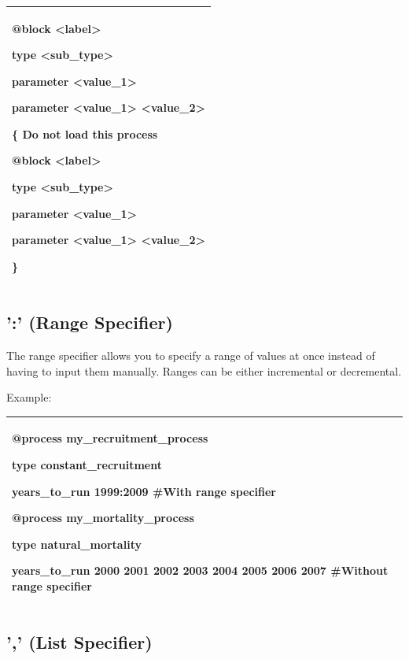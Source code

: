 \documentclass[a4paper,11pt,twoside,pdftex,draft]{article}
\begin{document}
\begin{longtable}[]{@{}l@{}}
\toprule
\endhead
\begin{minipage}[t]{0.97\columnwidth}\raggedright
@block \textless label\textgreater{}

type \textless sub\_type\textgreater{}

parameter \textless value\_1\textgreater{}

parameter \textless value\_1\textgreater{}
\textless value\_2\textgreater{}

\{ Do not load this process

@block \textless label\textgreater{}

type \textless sub\_type\textgreater{}

parameter \textless value\_1\textgreater{}

parameter \textless value\_1\textgreater{}
\textless value\_2\textgreater{}

\}\strut
\end{minipage}\tabularnewline
\bottomrule
\end{longtable}

\hypertarget{range-specifier}{%
\subsection{':' (Range Specifier)}\label{range-specifier}}

The range specifier allows you to specify a range of values at once
instead of having to input them manually. Ranges can be either
incremental or decremental.

Example:

\begin{longtable}[]{@{}l@{}}
\toprule
\endhead
\begin{minipage}[t]{0.97\columnwidth}\raggedright
@process my\_recruitment\_process

type constant\_recruitment

years\_to\_run 1999:2009 \#With range specifier

@process my\_mortality\_process

type natural\_mortality

years\_to\_run 2000 2001 2002 2003 2004 2005 2006 2007 \#Without range
specifier\strut
\end{minipage}\tabularnewline
\bottomrule
\end{longtable}

\hypertarget{list-specifier}{%
\subsection{',' (List Specifier)}\label{list-specifier}}
\end{document}
